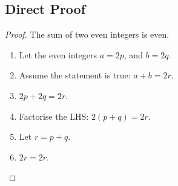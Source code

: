 \subsection{Direct Proof}
\begin{proof}
    The sum of two even integers is even.
    \begin{enumerate}
        \item Let the even integers \(a = 2p\), and \(b = 2q\).
        \item Assume the statement is true: \(a + b = 2r\).
        \item \(2p + 2q = 2r\).
        \item Factorise the LHS: \(2(p + q) = 2r\).
        \item Let \(r = p + q\).
        \item \(2r = 2r\).
    \end{enumerate}
\end{proof}

